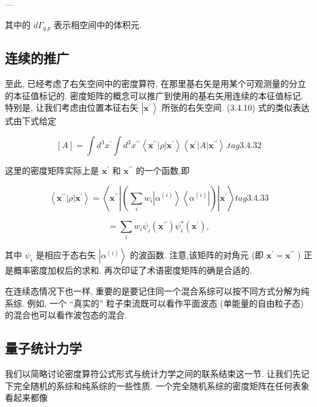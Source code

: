 ---

其中的 $d{\Gamma }_{q.p}$ 表示相空间中的体积元.

\subsection{连续的推广} 

至此, 已经考虑了右矢空间中的密度算符, 在那里基右矢是用某个可观测量的分立的本征值标记的. 密度矩阵的概念可以推广到使用的基右矢用连续的本征值标记. 特别是, 让我们考虑由位置本征右矢 $\left| {\mathbf{x}}^{\prime }\right\rangle$ 所张的右矢空间. (3.4.10) 式的类似表达式由下式给定

$$
\left\lbrack A\right\rbrack = \int {d}^{3}{x}^{\prime }\int {d}^{3}{x}^{\prime \prime }\left\langle {{\mathbf{x}}^{\prime \prime }\left| \rho \right| {\mathbf{x}}^{\prime }}\right\rangle \left\langle {{\mathbf{x}}^{\prime }\left| A\right| {\mathbf{x}}^{\prime \prime }}\right\rangle . tag{3. 4.32}
$$

这里的密度矩阵实际上是 ${\mathbf{x}}^{\prime }$ 和 ${\mathbf{x}}^{\prime \prime }$ 的一个函数,即

$$
\left\langle {{\mathbf{x}}^{\prime \prime }\left| \rho \right| {\mathbf{x}}^{\prime }}\right\rangle = \left\langle {{\mathbf{x}}^{\prime \prime }\left| \left( {\mathop{\sum }\limits_{i}{w}_{i}\left| {\alpha }^{\left( i\right) }\right\rangle \left\langle {\alpha }^{\left( i\right) }\right| }\right) \right| {\mathbf{x}}^{\prime }}\right\rangle tag{3. 4.33}
$$

$$
= \mathop{\sum }\limits_{i}{w}_{i}{\psi }_{i}\left( {\mathbf{x}}^{\prime \prime }\right) {\psi }_{i}^{ * }\left( {\mathbf{x}}^{\prime }\right) ,
$$

其中 ${\psi }_{i}$ 是相应于态右矢 $\left| {\alpha }^{\left( i\right) }\right\rangle$ 的波函数. 注意,该矩阵的对角元 (即 ${\mathbf{x}}^{\prime } = {\mathbf{x}}^{\prime \prime }$ ) 正是概率密度加权后的求和. 再次印证了术语密度矩阵的确是合适的.

在连续态情况下也一样, 重要的是要记住同一个混合系综可以按不同方式分解为纯系综. 例如, 一个 “真实的” 粒子束流既可以看作平面波态 (单能量的自由粒子态) 的混合也可以看作波包态的混合.

\subsection{量子统计力学}

我们以简略讨论密度算符公式形式与统计力学之间的联系结束这一节. 让我们先记下完全随机的系综和纯系综的一些性质. 一个完全随机系综的密度矩阵在任何表象看起来都像

